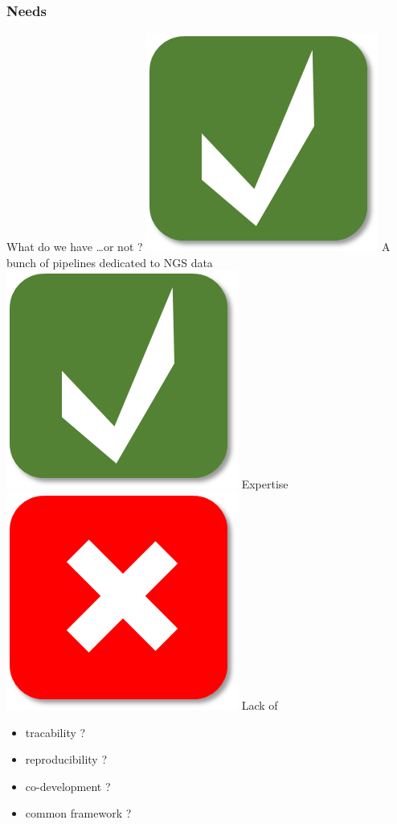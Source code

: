 \documentclass{beamer}
\begin{document}
\begin{frame}
 \frametitle{Needs}
 
    \begin{block}{What do we have \dots or not ?}
     \includegraphics[scale=0.05]{positive.png}\; A bunch of pipelines dedicated to NGS data\\
     \includegraphics[scale=0.05]{positive.png}\; Expertise\\
     \includegraphics[scale=0.05]{negative.png}\; Lack of \\
	\begin{itemize}
	 \item tracability ?
	 \item reproducibility ? 
	 \item co-development ? 
	 \item common framework ?
	\end{itemize}
    \end{block}
    

\end{frame}
\end{document}
